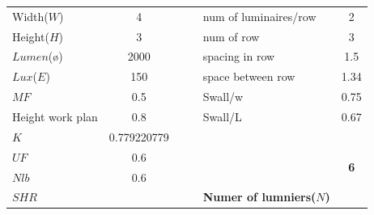 \documentclass[12pt,fleqn]{book} %
\begin{document}
\begin{enumerate}
\begin{table}[!h]
\begin{tabular}{lclllc}
{\cellcolor[rgb]{0.467,0.804,0.933}}Width($W$)       & 4                               &  &  & {\cellcolor[rgb]{0.467,0.804,0.933}}num of luminaires/row                              & 2                             \\
{\cellcolor[rgb]{0.467,0.804,0.933}}Height($H$)      & 3                               &  &  & {\cellcolor[rgb]{0.467,0.804,0.933}}num of row                                         & 3                             \\
{\cellcolor[rgb]{0.467,0.804,0.933}}$Lumen$(ø)       & 2000                            &  &  & {\cellcolor[rgb]{0.467,0.804,0.933}}spacing in row                                     & 1.5                           \\
{\cellcolor[rgb]{0.467,0.804,0.933}}$Lux $($E$)      & 150                             &  &  & {\cellcolor[rgb]{0.467,0.804,0.933}}space between row                                  & 1.34                          \\
{\cellcolor[rgb]{0.467,0.804,0.933}}$MF$             & 0.5                             &  &  & {\cellcolor[rgb]{0.467,0.804,0.933}}Swall/w                                            & 0.75                          \\
{\cellcolor[rgb]{0.467,0.804,0.933}}Height work plan & 0.8                             &  &  & {\cellcolor[rgb]{0.467,0.804,0.933}}Swall/L                                            & 0.67                          \\
{\cellcolor[rgb]{0.467,0.804,0.933}}$K$              & 0.779220779                     &  &  & {\cellcolor[rgb]{0.467,0.804,0.933}}                                                   & \multirow{4}{*}{\textbf{6 }}  \\
{\cellcolor[rgb]{0.467,0.804,0.933}}$UF$             & 0.6                             &  &  & {\cellcolor[rgb]{0.467,0.804,0.933}}                                                   &                               \\
{\cellcolor[rgb]{0.467,0.804,0.933}}$Nlb$            & 0.6                             &  &  & {\cellcolor[rgb]{0.467,0.804,0.933}}                                                   &                               \\
{\cellcolor[rgb]{0.467,0.804,0.933}}$SHR$            &                                 &  &  & \multirow{-4}{*}{{\cellcolor[rgb]{0.467,0.804,0.933}}\textbf{Numer of lumniers($N$) }} &                              
\end{tabular}
\end{table}

\end{enumerate}
\end{document}
